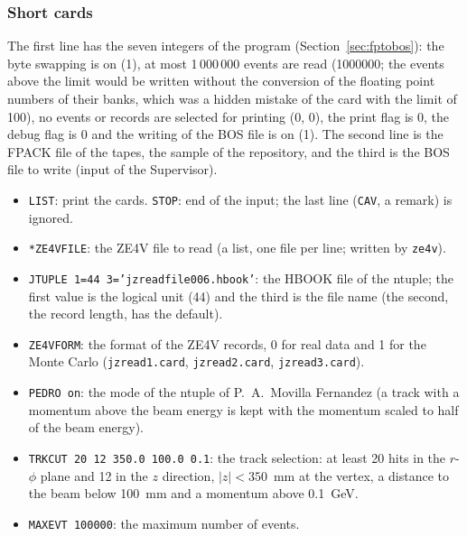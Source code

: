 \subsubsection{Short cards}

The first line has the seven integers of the program (Section~\ref{sec:fptobos}): the byte swapping is on (1), at most 1\,000\,000 events are read (1000000; the events above the limit would be written without the conversion of the floating point numbers of their banks, which was a hidden mistake of the card with the limit of 100), no events or records are selected for printing
(0, 0), the print flag is 0, the debug flag is 0 and the writing of the BOS file is on (1). The second line is the FPACK file of the tapes, the sample of the repository, and the third is the BOS file to write
(input of the Supervisor).


\begin{itemize}
\item \texttt{LIST}: print the cards. \texttt{STOP}: end of the input; the last line (\texttt{CAV}, a remark) is ignored.
\item \texttt{*ZE4VFILE}: the ZE4V file to read (a list, one file per line; written by \texttt{ze4v}).
\item \texttt{JTUPLE 1=44 3='jzreadfile006.hbook'}: the HBOOK file of the ntuple; the first value is the logical unit (44) and the third is the file name (the second, the record length, has the default).
\item \texttt{ZE4VFORM}: the format of the ZE4V records, 0 for real data and 1 for the Monte Carlo (\texttt{jzread1.card}, \texttt{jzread2.card}, \texttt{jzread3.card}).
\item \texttt{PEDRO on}: the mode of the ntuple of P.~A.~Movilla Fernandez (a track with a momentum above the beam energy is kept with the momentum scaled to half of the beam energy).
\item \texttt{TRKCUT 20 12 350.0 100.0 0.1}: the track selection: at least 20 hits in the $r$-$\phi$ plane and 12 in the $z$ direction, $|z|<350$~mm at the vertex, a distance to the beam below 100~mm and a momentum above 0.1~GeV.
\item \texttt{MAXEVT 100000}: the maximum number of events.
\end{itemize}

